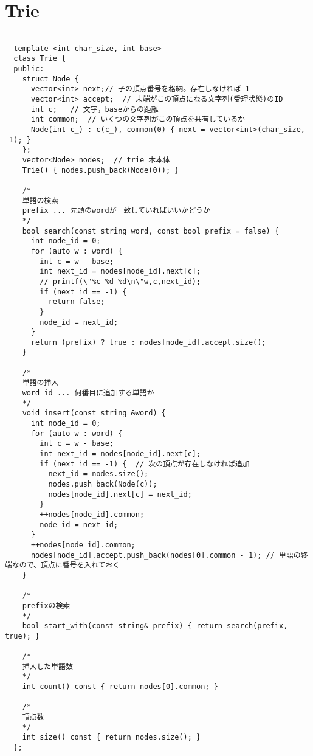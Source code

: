 \documentclass{jsarticle}
\begin{document}
\section{Trie}
\color{black}
\begin{lstlisting}[caption=Trie]

  template <int char_size, int base>
  class Trie {
  public:
    struct Node {
      vector<int> next;// 子の頂点番号を格納。存在しなければ-1
      vector<int> accept;  // 末端がこの頂点になる文字列(受理状態)のID
      int c;   // 文字，baseからの距離
      int common;  // いくつの文字列がこの頂点を共有しているか
      Node(int c_) : c(c_), common(0) { next = vector<int>(char_size, -1); }
    };
    vector<Node> nodes;  // trie 木本体
    Trie() { nodes.push_back(Node(0)); }
  
    /*
    単語の検索
    prefix ... 先頭のwordが一致していればいいかどうか
    */
    bool search(const string word, const bool prefix = false) {
      int node_id = 0;
      for (auto w : word) {
        int c = w - base;
        int next_id = nodes[node_id].next[c];
        // printf(\"%c %d %d\n\"w,c,next_id);
        if (next_id == -1) {
          return false;
        }
        node_id = next_id;
      }
      return (prefix) ? true : nodes[node_id].accept.size();
    }
  
    /*
    単語の挿入
    word_id ... 何番目に追加する単語か
    */
    void insert(const string &word) {
      int node_id = 0;
      for (auto w : word) {
        int c = w - base;
        int next_id = nodes[node_id].next[c];
        if (next_id == -1) {  // 次の頂点が存在しなければ追加
          next_id = nodes.size();
          nodes.push_back(Node(c));
          nodes[node_id].next[c] = next_id;
        }
        ++nodes[node_id].common;
        node_id = next_id;
      }
      ++nodes[node_id].common;
      nodes[node_id].accept.push_back(nodes[0].common - 1); // 単語の終端なので、頂点に番号を入れておく
    }
  
    /*
    prefixの検索
    */
    bool start_with(const string& prefix) { return search(prefix, true); }
  
    /*
    挿入した単語数
    */
    int count() const { return nodes[0].common; }
  
    /*
    頂点数
    */
    int size() const { return nodes.size(); }
  };
  

\end{lstlisting}

\color{white}
\end{document}
